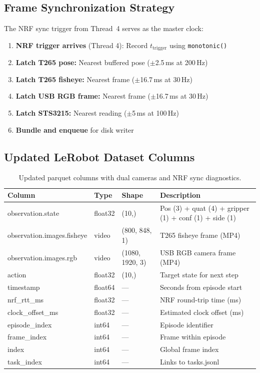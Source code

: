 \documentclass[11pt,a4paper]{article}
\begin{document}
\subsection{Frame Synchronization Strategy}

The NRF sync trigger from Thread~4 serves as the master clock:

\begin{enumerate}
  \item \textbf{NRF trigger arrives} (Thread 4): Record $t_{\text{trigger}}$ using \texttt{monotonic()}
  \item \textbf{Latch T265 pose:} Nearest buffered pose ($\pm$2.5\,ms at 200\,Hz)
  \item \textbf{Latch T265 fisheye:} Nearest frame ($\pm$16.7\,ms at 30\,Hz)
  \item \textbf{Latch USB RGB frame:} Nearest frame ($\pm$16.7\,ms at 30\,Hz)
  \item \textbf{Latch STS3215:} Nearest reading ($\pm$5\,ms at 100\,Hz)
  \item \textbf{Bundle and enqueue} for disk writer
\end{enumerate}

\subsection{Updated LeRobot Dataset Columns}

\begin{table}[htbp]
\centering
\caption{Updated parquet columns with dual cameras and NRF sync diagnostics.}
\small
\begin{tabular}{l l l l}
\toprule
\textbf{Column} & \textbf{Type} & \textbf{Shape} & \textbf{Description} \\
\midrule
observation.state & float32 & (10,) & Pos (3) + quat (4) + gripper (1) + conf (1) + side (1) \\
observation.images.fisheye & video & (800, 848, 1) & T265 fisheye frame (MP4) \\
observation.images.rgb & video & (1080, 1920, 3) & USB RGB camera frame (MP4) \\
action & float32 & (10,) & Target state for next step \\
timestamp & float64 & --- & Seconds from episode start \\
nrf\_rtt\_ms & float32 & --- & NRF round-trip time (ms) \\
clock\_offset\_ms & float32 & --- & Estimated clock offset (ms) \\
episode\_index & int64 & --- & Episode identifier \\
frame\_index & int64 & --- & Frame within episode \\
index & int64 & --- & Global frame index \\
task\_index & int64 & --- & Links to tasks.jsonl \\
\bottomrule
\end{tabular}
\label{tab:parquet-columns}
\end{table}
\end{document}
